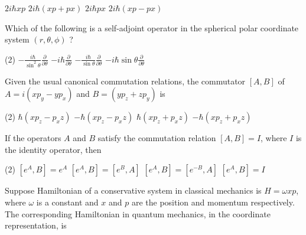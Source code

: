 \begin{enumerate}
\begin{tasks}
	\task[\textbf{A.}] $2 i \hbar x p$
	\task[\textbf{B.}]$2 i \hbar(x p+p x)$
	\task[\textbf{C.}]$2 i \hbar p x$
	\task[\textbf{D.}]$2 i \hbar(x p-p x)$
\end{tasks}
\begin{minipage}{\textwidth}
	\item Which of the following is a self-adjoint operator in the spherical polar coordinate system $(r, \theta, \phi)$ ?
\end{minipage}
\begin{tasks}(2)
	\task[\textbf{A.}] $-\frac{i \hbar}{\sin ^{2} \theta} \frac{\partial}{\partial \theta}$
	\task[\textbf{B.}]$-i \hbar \frac{\partial}{\partial \theta}$
	\task[\textbf{C.}] $-\frac{i \hbar}{\sin \theta} \frac{\partial}{\partial \theta}$
	\task[\textbf{D.}] $-i \hbar \sin \theta \frac{\partial}{\partial \theta}$
\end{tasks}
\begin{minipage}{\textwidth}
	\item Given the usual canonical commutation relations, the commutator $[A, B]$ of $A=i\left(x p_{y}-y p_{x}\right)$ and $B=\left(y p_{z}+z p_{y}\right)$ is
\end{minipage}
\begin{tasks}(2)
	\task[\textbf{A.}] $\hbar\left(x p_{z}-p_{x} z\right)$
	\task[\textbf{B.}]$-\hbar\left(x p_{z}-p_{x} z\right)$
	\task[\textbf{C.}]$\hbar\left(x p_{z}+p_{x} z\right)$
	\task[\textbf{D.}]$-\hbar\left(x p_{z}+p_{x} z\right)$
\end{tasks}
\begin{minipage}{\textwidth}
	\item If the operators $A$ and $B$ satisfy the commutation relation $[A, B]=I$, where $I$ is the identity operator, then
\end{minipage}
\begin{tasks}(2)
	\task[\textbf{A.}] $\left[e^{A}, B\right]=e^{A}$
	\task[\textbf{B.}]$\left[e^{A}, B\right]=\left[e^{B}, A\right]$
	\task[\textbf{C.}]$\left[e^{A}, B\right]=\left[e^{-B}, A\right]$
	\task[\textbf{D.}]$\left[e^{A}, B\right]=I$
\end{tasks}
\begin{minipage}{\textwidth}
	\item Suppose Hamiltonian of a conservative system in classical mechanics is $H=\omega x p$, where $\omega$ is a constant and $x$ and $p$ are the position and momentum respectively. The corresponding Hamiltonian in quantum mechanics, in the coordinate representation, is

\end{minipage}
\end{enumerate}
